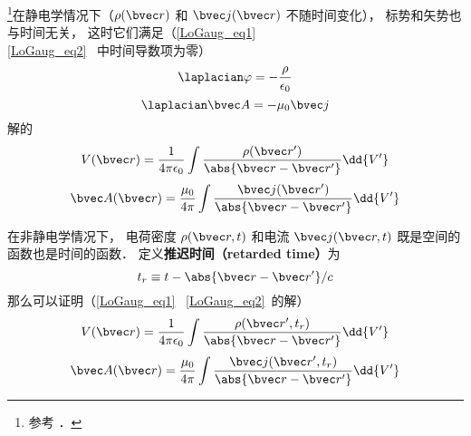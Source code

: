 

\footnote{参考 \cite{GriffE}．}在静电学情况下（$\rho(\bvec r)$ 和 $\bvec j(\bvec r)$ 不随时间变化）， 标势和矢势也与时间无关， 这时它们满足（\autoref{LoGaug_eq1}~ \autoref{LoGaug_eq2}~ 中时间导数项为零）
\begin{equation}
\laplacian \varphi = -\frac{\rho}{\epsilon_0}
\end{equation}
\begin{equation}
\laplacian \bvec A = -\mu_0 \bvec j
\end{equation}
解的
\begin{equation}
V(\bvec r) = \frac{1}{4\pi\epsilon_0} \int \frac{\rho(\bvec r')}{\abs{\bvec r - \bvec r'}} \dd{V'}
\end{equation}
\begin{equation}
\bvec A(\bvec r) = \frac{\mu_0}{4\pi} \int \frac{\bvec j(\bvec r')}{\abs{\bvec r - \bvec r'}} \dd{V'}
\end{equation}

在非静电学情况下， 电荷密度 $\rho(\bvec r, t)$ 和电流 $\bvec j(\bvec r, t)$ 既是空间的函数也是时间的函数． 定义\textbf{推迟时间（retarded time）}为
\begin{equation}
t_r \equiv t - \abs{\bvec r - \bvec r'}/c
\end{equation}
那么可以证明（\autoref{LoGaug_eq1}~ \autoref{LoGaug_eq2}~的解）
\begin{equation}
V(\bvec r) = \frac{1}{4\pi\epsilon_0} \int \frac{\rho(\bvec r', t_r)}{\abs{\bvec r - \bvec r'}} \dd{V'}
\end{equation}
\begin{equation}
\bvec A(\bvec r) = \frac{\mu_0}{4\pi} \int \frac{\bvec j(\bvec r', t_r)}{\abs{\bvec r - \bvec r'}} \dd{V'}
\end{equation}
